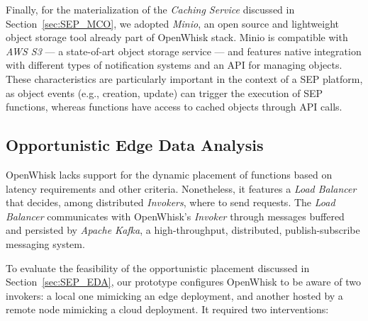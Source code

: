 
Finally, for the materialization of the \textit{Caching Service} discussed in Section~\ref{sec:SEP_MCO}, we adopted \textit{Minio}, an open source and lightweight object storage tool already part of OpenWhisk stack.
Minio is compatible with \textit{AWS S3} --- a state-of-art object storage service --- and features native integration with different types of notification systems and an API for managing objects. These characteristics are particularly important in the context of a SEP platform, as object events (e.g., creation, update) can trigger the execution of SEP functions, whereas functions have access to cached objects through API calls. 





\subsection{Opportunistic Edge Data Analysis}

OpenWhisk lacks support for the dynamic placement of functions based on latency requirements and other criteria. Nonetheless, it features a \textit{Load Balancer} that decides, among distributed \textit{Invokers}, where to send requests. 
The \textit{Load Balancer} communicates with OpenWhisk's \textit{Invoker} through messages buffered and persisted by \textit{Apache Kafka}, a high-throughput, distributed, publish-subscribe messaging system.


To evaluate the feasibility of the opportunistic placement discussed in Section~\ref{sec:SEP_EDA}, our prototype configures OpenWhisk to be aware of two invokers: a local one mimicking an edge deployment, and another hosted by a remote node mimicking a cloud deployment. It required two interventions: 

